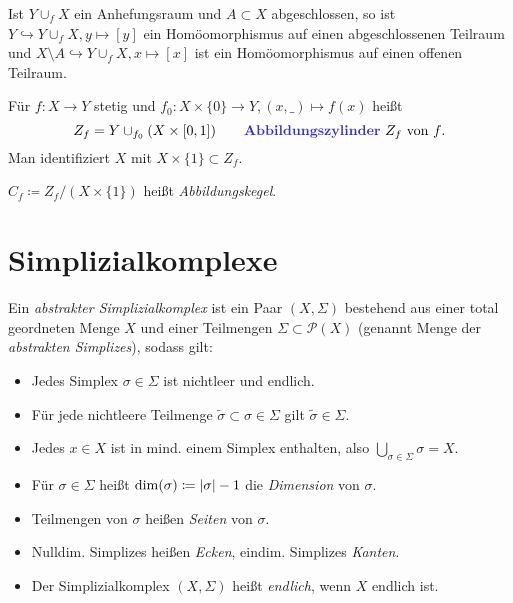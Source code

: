 \documentclass{cheat-sheet}
\begin{document}
\begin{prop}
  Ist $Y \cup_f X$ ein Anhefungsraum und $A \subset X$ abgeschlossen, so ist $Y \hookrightarrow Y \cup_f X, y \mapsto [y]$ ein Homöomorphismus auf einen abgeschlossenen Teilraum und $X \setminus A \hookrightarrow Y \cup_f X, x \mapsto [x]$ ist ein Homöomorphismus auf einen offenen Teilraum.
\end{prop}

\begin{defn}
  Für $f : X \to Y$ stetig und $f_0 : X \times \{ 0 \} \to Y, (x, \_) \mapsto f(x)$ heißt
  \[
    Z_f = Y \cup_{f_0} (X \times \I)
    \qquad \text{\emph{Abbildungszylinder} $Z_f$ von $f$.}
  \]
  Man identifiziert $X$ mit $X \times \{ 1 \} \subset Z_f$.
\end{defn}

\begin{defn}
  $C_f \coloneqq Z_f / (X \times \{ 1 \})$ heißt \emph{Abbildungskegel}.
\end{defn}

\section{Simplizialkomplexe}

\begin{defn}
  Ein \emph{abstrakter Simplizialkomplex} ist ein Paar $(X, \Sigma)$ bestehend aus einer total geordneten Menge $X$ und einer Teilmengen $\Sigma \subset \mathcal{P}(X)$ (genannt Menge der \emph{abstrakten Simplizes}), sodass gilt:
  \begin{itemize}
    \item Jedes Simplex $\sigma \in \Sigma$ ist nichtleer und endlich.
    \item Für jede nichtleere Teilmenge $\tilde{\sigma} \subset \sigma \in \Sigma$ gilt $\tilde{\sigma} \in \Sigma$.
    \item Jedes $x \!\in\! X$ ist in mind. einem Simplex enthalten, also $\bigcup_{\sigma \in \Sigma} \! \sigma = X$.
  \end{itemize}
\end{defn}

\begin{defn}
  \begin{itemize}
    \item Für $\sigma \in \Sigma$ heißt $\dim(\sigma) \coloneqq \lvert\sigma\rvert - 1$ die \emph{Dimension} von $\sigma$.
    \item Teilmengen von $\sigma$ heißen \emph{Seiten} von $\sigma$.
    \item Nulldim. Simplizes heißen \emph{Ecken}, eindim. Simplizes \emph{Kanten}.
    \item Der Simplizialkomplex $(X, \Sigma)$ heißt \emph{endlich}, wenn $X$ endlich ist.
  \end{itemize}
\end{defn}
\end{document}
